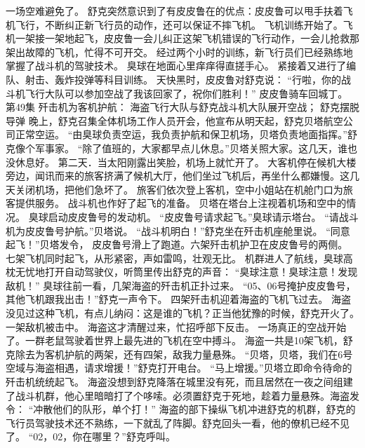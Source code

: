 \documentclass[a4paper,12pt,UTF8,twoside]{ctexbook}
\begin{document}
        一场空难避免了。 
        舒克突然意识到了有皮皮鲁在的优点：皮皮鲁可以甩手扶着飞机飞行，不断纠正新飞行员的动作，还可以保证不摔飞机。 
        飞机训练开始了。飞机一架接一架地起飞，皮皮鲁一会儿纠正这架飞机错误的飞行动作，一会儿抢救那架出故障的飞机，忙得不可开交。 
        经过两个小时的训练，新飞行员们已经熟练地掌握了战斗机的驾驶技术。 
        臭球在地面心里痒痒得直搓手心。 
        紧接着又进行了编队、射击、轰炸投弹等科目训练。 
        天快黑时，皮皮鲁对舒克说： 
        “行啦，你的战斗机飞行大队可以参加空战了我该回家了，祝你们胜利！” 
        皮皮鲁骑车回城丁。   第49集 
        歼击机为客机护航： 
        海盗飞行大队与舒克战斗机大队展开空战； 
        舒克摆脱导弹   
        晚上，舒克召集全体机场工作人员开会，他宣布从明天起，舒克贝塔航空公司正常空运。 
        “由臭球负责空运，我负责护航和保卫机场，贝塔负责地面指挥。”舒克像个军事家。 
        “除了值班的，大家都早点儿休息。”贝塔关照大家。这几天，谁也没休息好。 
        第二天．当太阳刚露出笑脸，机场上就忙开了。 
        大客机停在候机大楼旁边，闻讯而来的旅客挤满了候机大厅，他们坐过飞机后，再坐什么都嫌慢。这几天关闭机场，把他们急坏了。 
        旅客们依次登上客机，空中小姐站在机舱门口为旅客提供服务。 
        战斗机也作好了起飞的准备。 
        贝塔在塔台上注视着机场和空中的情况。 
        臭球启动皮皮鲁号的发动机。 
        “皮皮鲁号请求起飞。”臭球请示塔台。 
        “请战斗机为皮皮鲁号护航。”贝塔说。 
        “战斗机明白！”舒克坐在歼击机座舱里说。 
        “同意起飞！”贝塔发令， 
        皮皮鲁号滑上了跑道。六架歼击机护卫在皮皮鲁号的两侧。 
        七架飞机同时起飞，从形紧密，声如雷鸣，壮观无比。 
        机群进人了航线，臭球高枕无忧地打开自动驾驶仪，听筒里传出舒克的声音： 
        “臭球注意！臭球注意！发现敌机！” 
        臭球往前一看，几架海盗的歼击机正扑过来。 
        “05、06号掩护皮皮鲁号，其他飞机跟我出击！”舒克一声令下。 
        四架歼击机迎着海盗的飞机飞过去。 
        海盗没见过这种飞机，有点儿纳闷：这是谁的飞机？正当他犹豫的时候，舒克开火了。一架敌机被击中。 
        海盗这才清醒过来，忙招呼部下反击。 
        一场真正的空战开始了。一群老鼠驾驶着世界上最先进的飞机在空中搏斗。 
        海盗一共是10架飞机，舒克除去为客机护航的两架，还有四架，敌我力量悬殊。 
        “贝塔，贝塔，我们在6号空域与海盗相遇，请求增援！”舒克打开电台。 
        “马上增援。”贝塔立即命令待命的歼击机统统起飞。 
        海盗没想到舒克降落在城里没有死，而且居然在一夜之间组建了战斗机群，他心里暗暗打了个哆嗦。必须置舒克于死地，趁着力量悬殊。海盗发令： 
        “冲散他们的队形，单个打！” 
        海盗的部下操纵飞机冲进舒克的机群，舒克的飞行员驾驶技术还不熟练，一下就乱了阵脚。舒克回头一看，他的僚机已经不见了。 
        “02，02，你在哪里？”舒克呼叫。 
\end{document}
